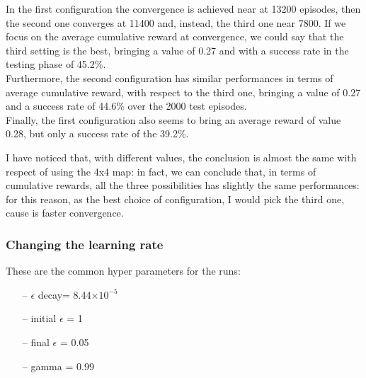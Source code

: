 \documentclass{article}
\begin{document}
\begin{center}
\centering
{}
\end{center}

\clearpage

In the first configuration the convergence is achieved near at 13200 episodes, then the second one converges at 11400 and, instead, the third one near 7800.
If we focus on the average cumulative reward at convergence, we could say that the third setting is the best, bringing a value of 0.27 and with a success rate in the testing phase of 45.2\%.
\\
Furthermore, the second configuration has similar performances in terms of average cumulative reward, with respect to the third one, bringing a value of 0.27 and a success rate of 44.6\% over the 2000 test episodes.
\\
Finally, the first configuration also seems to bring an average reward of value 0.28, but only a success rate of the 39.2\%.

I have noticed that, with different values, the conclusion is almost the same with respect of using the 4x4 map: in fact, we can conclude that, in terms of cumulative rewards, all the three possibilities has slightly the same performances:
\\
for this reason, as the best choice of configuration, I would pick the third one, cause is faster convergence.




\subsubsection{Changing the learning rate}


These are the common hyper parameters for the runs:
\begin{itemize}
\item[--] $\epsilon$ decay= 8.44$\times10^{-5}$
\item[--] initial $\epsilon$ = 1
\item[--] final $\epsilon$ = 0.05
\item[--] gamma = 0.99
\end{itemize}
\end{document}
